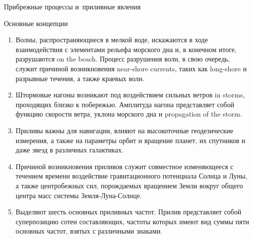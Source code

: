 \begin{chapter}{Прибрежные процессы и~приливные явления}
\begin{section}{Основные концепции}
\begin{enumerate}
\item 
Волны, распространяющиеся в мелкой воде, искажаются в ходе взаимодействия
с элементами рельефа морского дна и, в конечном итоге, разрушаются on the beach. 
Процесс разрушения волн, в свою очередь, служит причиной возникновения 
near-shore currents, таких как long-shore и разрывные 
течения, а также краевых волн.
%

\item 
Штормовые нагоны возникают под воздействием сильных ветров in storms, 
проходящих близко к побережью. 
Амплитуда нагона представляет собой функцию скорости ветра, уклона морского
дна и propagation of the storm.
%

\item 
Приливы важны для навигации, влияют на высокоточные геодезические измерения,
а также на параметры орбит и вращение планет, их спутников и даже звезд
в различных галактиках.
%

\item 
Причиной возникновения приливов служит совместное изменяющееся с течением
времени воздействие гравитационного потенциала Солнца и Луны, а также
центробежных сил, порождаемых вращением Земли вокруг общего центра масс
системы Земля-Луна-Солнце.
%

\item 
Выделяют шесть основных приливных частот. Прилив представляет собой 
суперпозицию сотен составляющих, частоты которых имеют вид суммы пяти 
основных частот, взятых с различными знаками.
%


\end{enumerate}
\end{section}
\end{chapter}
